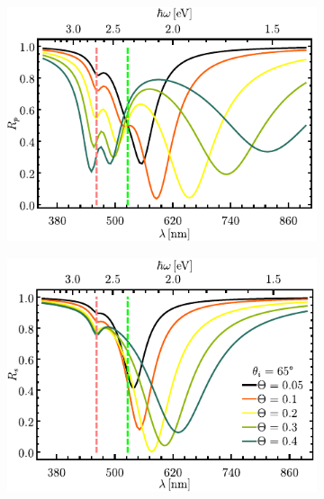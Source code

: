 		\begin{figure}[h!]\centering\hspace*{-1.5em}
	\begin{subfigure}{.01\linewidth}\caption{}\label{sfig:R-ATR4-cutp}\vspace{4.5cm}\end{subfigure}
	\begin{subfigure}{.45\linewidth}\hspace*{-1.5em}
	\includegraphics[scale=1]{2-Resultados/figs/1-Wp4ThetaVar/cut_angle_65_p.pdf}\end{subfigure}
	\begin{subfigure}{.01\linewidth}\caption{}\label{sfig:R-ATR4-cuts}\vspace{4.5cm}\end{subfigure}\hspace*{-1.em}
	\begin{subfigure}{.45\linewidth}\centering
	\includegraphics[scale=1 ]{2-Resultados/figs/1-Wp4ThetaVar/cut_angle_65_s.pdf}\end{subfigure}\vspace*{-.7em}

\end{figure}
